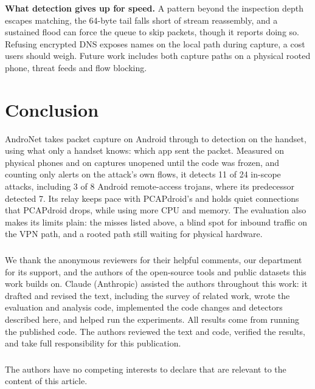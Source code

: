 \documentclass[runningheads]{llncs}
\begin{document}
\textbf{What detection gives up for speed.} A pattern beyond the inspection depth escapes matching, the 64-byte tail falls short of stream reassembly, and a sustained flood can force the queue to skip packets, though it reports doing so. Refusing encrypted DNS exposes names on the local path during capture, a cost users should weigh. Future work includes both capture paths on a physical rooted phone, threat feeds and flow blocking.

\section{Conclusion}\label{sec:conclusion}

AndroNet takes packet capture on Android through to detection on the handset, using what only a handset knows: which app sent the packet. Measured on physical phones and on captures unopened until the code was frozen, and counting only alerts on the attack's own flows, it detects 11 of 24 in-scope attacks, including 3 of 8 Android remote-access trojans, where its predecessor detected 7. Its relay keeps pace with PCAPdroid's and holds quiet connections that PCAPdroid drops, while using more CPU and memory. The evaluation also makes its limits plain: the misses listed above, a blind spot for inbound traffic on the VPN path, and a rooted path still waiting for physical hardware.

\begin{credits}
\subsubsection{\ackname} We thank the anonymous reviewers for their helpful comments, our department for its support, and the authors of the open-source tools and public datasets this work builds on. Claude (Anthropic) assisted the authors throughout this work: it drafted and revised the text, including the survey of related work, wrote the evaluation and analysis code, implemented the code changes and detectors described here, and helped run the experiments. All results come from running the published code. The authors reviewed the text and code, verified the results, and take full responsibility for this publication.

\subsubsection{\discintname} The authors have no competing interests to declare that are relevant to the content of this article.
\end{credits}



\end{document}
